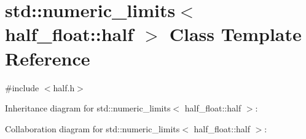 \hypertarget{classstd_1_1numeric__limits_3_01half__float_1_1half_01_4}{}\section{std\+:\+:numeric\+\_\+limits$<$ half\+\_\+float\+:\+:half $>$ Class Template Reference}
\label{classstd_1_1numeric__limits_3_01half__float_1_1half_01_4}


{\ttfamily \#include $<$half.\+h$>$}



Inheritance diagram for std\+:\+:numeric\+\_\+limits$<$ half\+\_\+float\+:\+:half $>$\+:


Collaboration diagram for std\+:\+:numeric\+\_\+limits$<$ half\+\_\+float\+:\+:half $>$\+:
